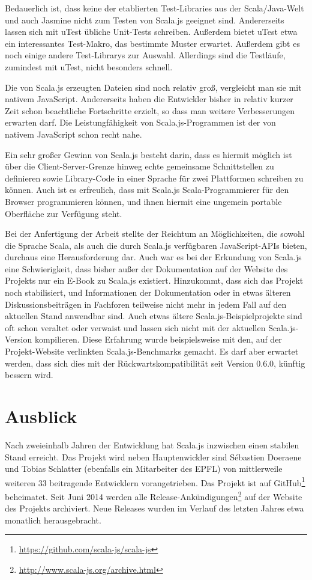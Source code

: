 \documentclass[a4paper, 12pt, hidelinks, listof=totoc, listoftables=totoc, bibliography=totoc]{scrreprt}
\begin{document}
Bedauerlich ist, dass keine der etablierten Test-Libraries aus der Scala/Java-Welt und auch Jasmine nicht zum Testen von Scala.js geeignet sind. Andererseits lassen sich mit uTest übliche Unit-Tests schreiben. Außerdem bietet uTest etwa ein interessantes Test-Makro, das bestimmte Muster erwartet. Außerdem gibt es noch einige andere Test-Librarys zur Auswahl. Allerdings sind die Testläufe, zumindest mit uTest, nicht besonders schnell.

Die von Scala.js erzeugten Dateien sind noch relativ groß, vergleicht man sie mit nativem JavaScript. Andererseits haben die Entwickler bisher in relativ kurzer Zeit schon beachtliche Fortschritte erzielt, so dass man weitere Verbesserungen erwarten darf. Die Leistungfähigkeit von Scala.js-Programmen ist der von nativem JavaScript schon recht nahe.

Ein sehr großer Gewinn von Scala.js besteht darin, dass es hiermit möglich ist über die Client-Server-Grenze hinweg echte gemeinsame Schnittstellen zu definieren sowie Library-Code in einer Sprache für zwei Plattformen schreiben zu können. Auch ist es erfreulich, dass mit Scala.js Scala-Programmierer für den Browser programmieren können, und ihnen hiermit eine ungemein portable Oberfläche zur Verfügung steht.

Bei der Anfertigung der Arbeit stellte der Reichtum an Möglichkeiten, die sowohl die Sprache Scala, als auch die durch Scala.js verfügbaren JavaScript-\ac{API}s bieten, durchaus eine Herausforderung dar. Auch war es bei der Erkundung von Scala.js eine Schwierigkeit, dass bisher außer der Dokumentation auf der Website des Projekts nur ein E-Book zu Scala.js existiert. Hinzukommt, dass sich das Projekt noch stabilisiert, und Informationen der Dokumentation oder in etwas älteren Diskussionsbeiträgen in Fachforen teilweise nicht mehr in jedem Fall auf den aktuellen Stand anwendbar sind. Auch etwas ältere Scala.js-Beispielprojekte sind oft schon veraltet oder verwaist und lassen sich nicht mit der aktuellen Scala.js-Version kompilieren. Diese Erfahrung wurde beispielsweise mit den, auf der Projekt-Website verlinkten Scala.js-Benchmarks gemacht. Es darf aber erwartet werden, dass sich dies mit der Rückwartskompatibilität seit Version 0.6.0, künftig bessern wird.



\section{Ausblick}

Nach zweieinhalb Jahren der Entwicklung hat Scala.js inzwischen einen stabilen Stand erreicht. Das Projekt wird neben Hauptenwickler sind Sébastien Doeraene und Tobias Schlatter (ebenfalls ein Mitarbeiter des \ac{EPFL}) von mittlerweile weiteren 33 beitragende Entwicklern vorangetrieben. Das Projekt ist auf GitHub\footnote{\url{https://github.com/scala-js/scala-js}} beheimatet. Seit Juni 2014 werden alle Release-Ankündigungen\footnote{\url{http://www.scala-js.org/archive.html}} auf der Website des Projekts archiviert. Neue Releases wurden im Verlauf des letzten Jahres etwa monatlich herausgebracht.
\end{document}
